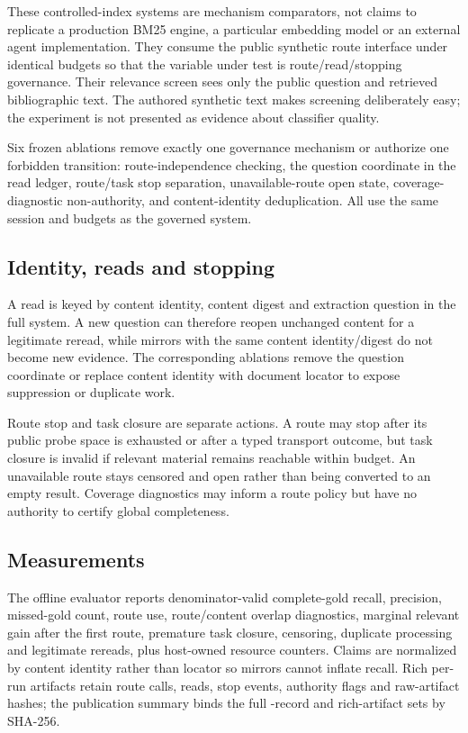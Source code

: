 These controlled-index systems are mechanism comparators, not claims to
replicate a production BM25 engine, a particular embedding model or an external
agent implementation.  They consume the public synthetic route interface under
identical budgets so that the variable under test is route/read/stopping
governance.  Their relevance screen sees only the public question and retrieved
bibliographic text.  The authored synthetic text makes screening deliberately
easy; the experiment is not presented as evidence about classifier quality.

Six frozen ablations remove exactly one governance mechanism or authorize one
forbidden transition: route-independence checking, the question coordinate in
the read ledger, route/task stop separation, unavailable-route open state,
coverage-diagnostic non-authority, and content-identity deduplication.  All use
the same session and budgets as the governed system.

\subsection{Identity, reads and stopping}
A read is keyed by content identity, content digest and extraction question in
the full system.  A new question can therefore reopen unchanged content for a
legitimate reread, while mirrors with the same content identity/digest do not
become new evidence.  The corresponding ablations remove the question coordinate
or replace content identity with document locator to expose suppression or
duplicate work.

Route stop and task closure are separate actions.  A route may stop after its
public probe space is exhausted or after a typed transport outcome, but task
closure is invalid if relevant material remains reachable within budget.  An
unavailable route stays censored and open rather than being converted to an
empty result.  Coverage diagnostics may inform a route policy but have no
authority to certify global completeness.

\subsection{Measurements}
The offline evaluator reports denominator-valid complete-gold recall, precision,
missed-gold count, route use, route/content overlap diagnostics, marginal
relevant gain after the first route, premature task closure, censoring,
duplicate processing and legitimate rereads, plus host-owned resource counters.
Claims are normalized by content identity rather than locator so mirrors cannot
inflate recall.  Rich per-run artifacts retain route calls, reads, stop events,
authority flags and raw-artifact hashes; the publication summary binds the full
\OfflineRunRecordCount{}-record and rich-artifact sets by SHA-256.


